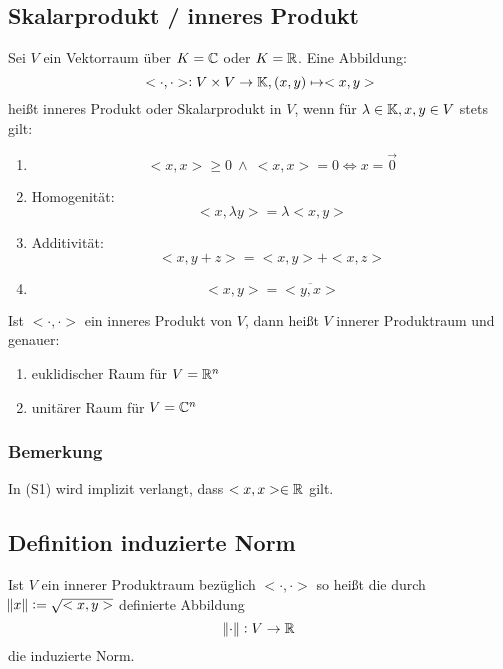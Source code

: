 \subsection{Skalarprodukt / inneres Produkt} Sei $V$ ein Vektorraum über $K =
\mathbb{C}$ oder $K=\mathbb{R}$. Eine Abbildung: \begin{equation*}     < \cdot, \cdot >: V
\times V \rightarrow \mathbb{K}, (x,y) \mapsto <x,y> \end{equation*}  heißt inneres
Produkt oder Skalarprodukt in $V$, wenn für $\lambda \in \mathbb{K}, x,y \in V$ stets gilt:
\begin{enumerate}
	\item
		\begin{equation*}
			<x,x> \geq 0\ \land\ <x,x> = 0 \Leftrightarrow x = \vec{0}
		\end{equation*}
	\item Homogenität:
		\begin{equation*}
			<x, \lambda y> = \lambda <x, y>
		\end{equation*}
	\item Additivität:
		\begin{equation*}
			<x, y+z> = <x,y> + <x,z>
		\end{equation*}
	\item
		\begin{equation*}
			<x,y> = \overline{<y,x>}
		\end{equation*}
\end{enumerate}
Ist $<\cdot,\cdot>$ ein inneres Produkt von $V$, dann heißt $V$ innerer Produktraum
und genauer:
\begin{enumerate}[label= (\alph*)]
	\item euklidischer Raum für $V = \mathbb{R}^n$
	\item unitärer Raum für $V = \mathbb{C}^n$
\end{enumerate}
\subsubsection{Bemerkung}
In (S1) wird implizit verlangt, dass $<x,x> \in \mathbb{R}$ gilt.

\subsection{Definition induzierte Norm}
Ist $V$ ein innerer Produktraum bezüglich $<\cdot,\cdot>$ so heißt die durch
$\norm{x}:=\sqrt{<x,y>}$ definierte Abbildung
\begin{equation*}
	\norm{\cdot}: V \rightarrow \mathbb{R}
\end{equation*}
die induzierte Norm.
